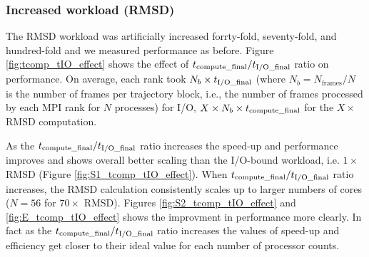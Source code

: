 \subsubsection{Increased workload (RMSD)}
The RMSD workload was artificially increased forrty-fold, seventy-fold, and hundred-fold and we measured performance as before. 
Figure \ref{fig:tcomp_tIO_effect} shows the effect of ${t}_{\text{compute\_final}}/{t}_{\text{I/O\_final}}$ ratio on performance.
On average, each rank took $N_{b} \times {t}_{\text{I/O\_final}} $ (where $N_{b}=N_{\text{frames}}/N$ is the
number of frames per trajectory block, i.e., the number of frames
processed by each MPI rank for $N$ processes) for I/O,
$X \times N_{b} \times {t}_{\text{compute\_final}}$ for the $X\times$ RMSD computation.

As the ${t}_{\text{compute\_final}}/{t}_{\text{I/O\_final}}$ ratio increases the speed-up and performance improves and 
shows overall better scaling than the I/O-bound workload, i.e. $1\times$ RMSD (Figure \ref{fig:S1_tcomp_tIO_effect}).
When ${t}_{\text{compute\_final}}/{t}_{\text{I/O\_final}}$ ratio increases, the RMSD calculation consistently scales up to larger numbers of cores ($N=56$ for $70\times$ RMSD).
Figures \ref{fig:S2_tcomp_tIO_effect} and \ref{fig:E_tcomp_tIO_effect} shows the improvment in performance more clearly.
In fact as the ${t}_{\text{compute\_final}}/{t}_{\text{I/O\_final}}$ ratio increases the values of speed-up and efficiency get closer to their ideal value for each number of processor counts.  

